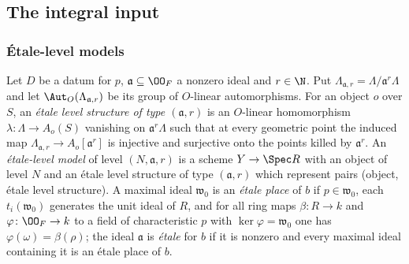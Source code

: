 \subsection{The integral input}\label{pf:ks2:sec:min}

\subsubsection{\'Etale-level models}

Let $D$ be a datum for $p$, $\mathfrak a\subseteq\kstwoOF$ a nonzero ideal and $r\in\N$. Put
$\Lambda_{\mathfrak a,r}=\Lambda/\mathfrak a^r\Lambda$ and
let $\Aut_O(\Lambda_{\mathfrak a,r})$ be its group of $O$-linear automorphisms. For an object $o$ over $S$, an \emph{\'etale level
structure of type $(\mathfrak a,r)$} is an $O$-linear
homomorphism $\lambda\colon\Lambda\to A_o(S)$ vanishing on $\mathfrak a^r\Lambda$ such that at every
geometric point the induced map $\Lambda_{\mathfrak a,r}\to A_o[\mathfrak a^r]$ is injective and
surjective onto the points killed by $\mathfrak a^r$. An \emph{\'etale-level model} of level
$(N,\mathfrak a,r)$ is a scheme $Y\to\Spec R$ with an
object of level $N$ and an \'etale level structure of type $(\mathfrak a,r)$ which represent
pairs (object, \'etale level structure). A maximal ideal $\mathfrak w_0$ is an \emph{\'etale place}
of $b$ if $p\in\mathfrak w_0$, each
$t_i(\mathfrak w_0)$ generates the unit ideal of $R$, and for all ring maps $\beta\colon R\to k$ and
$\varphi\colon\kstwoOF\to k$ to a field of characteristic $p$ with $\ker\varphi=\mathfrak w_0$ one has
$\varphi(\omega)=\beta(\rho)$; the ideal $\mathfrak a$ is \emph{\'etale} for $b$ if it is nonzero and every maximal ideal
containing it is an \'etale place of $b$.

